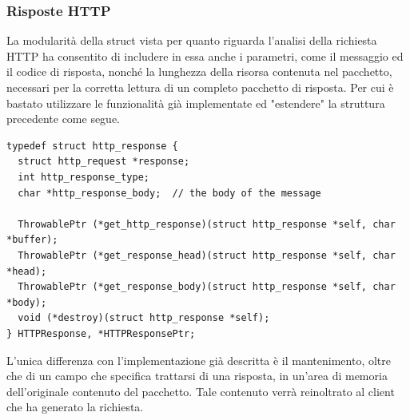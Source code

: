 \documentclass[italian]{tktltiki2}
\begin{document}
\subsubsection*{Risposte HTTP}
La modularità della struct vista per quanto riguarda l'analisi della richiesta HTTP ha consentito di includere in essa anche i parametri, come il messaggio ed il codice di risposta, nonché la lunghezza della risorsa contenuta nel pacchetto, necessari per la corretta lettura di un completo pacchetto di risposta. Per cui è bastato utilizzare le funzionalità già implementate ed "estendere" la struttura precedente come segue.
\begin{lstlisting}
typedef struct http_response {
  struct http_request *response;                           
  int http_response_type;                                 
  char *http_response_body;  // the body of the message

  ThrowablePtr (*get_http_response)(struct http_response *self, char *buffer);
  ThrowablePtr (*get_response_head)(struct http_response *self, char *head);
  ThrowablePtr (*get_response_body)(struct http_response *self, char *body);
  void (*destroy)(struct http_response *self);
} HTTPResponse, *HTTPResponsePtr;

\end{lstlisting}
L'unica differenza con l'implementazione già descritta è il mantenimento, oltre che di un campo che specifica trattarsi di una risposta, in un'area di memoria dell'originale contenuto del pacchetto. Tale contenuto verrà reinoltrato al client che ha generato la richiesta.
\end{document}
